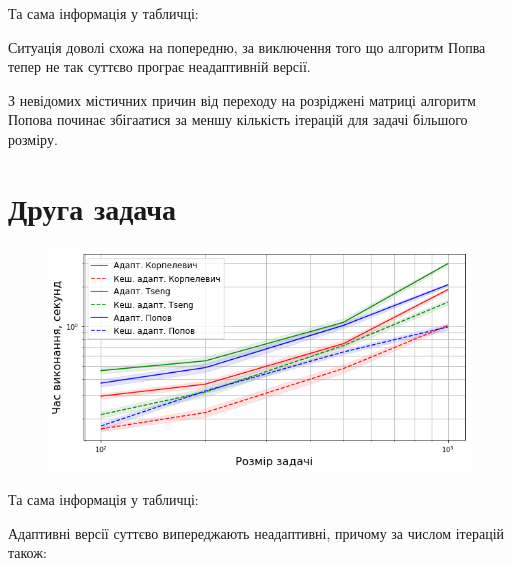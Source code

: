Та сама інформація у табличці:





Ситуація доволі схожа на попередню, за виключення того що алгоритм Попва тепер не так суттєво програє неадаптивній версії.

\begin{remark}
    З невідомих містичних причин від переходу на розріджені матриці алгоритм Попова починає збігаатися за меншу кількість ітерацій для задачі більшого розміру.
\end{remark}

\section{Друга задача}

\begin{figure}[H]
    \centering
    \includegraphics[width=.75\textwidth]{img/2/adapt/time.png}
\end{figure}

Та сама інформація у табличці:



Адаптивні версії суттєво випереджають неадаптивні, причому за числом ітерацій також:


